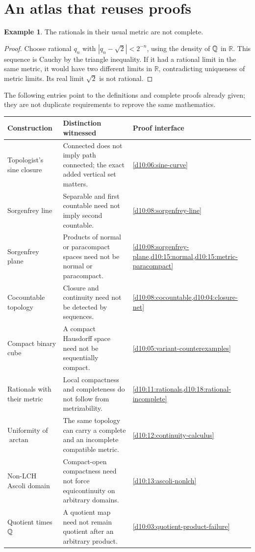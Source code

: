 \documentclass[11pt,oneside,openany]{book}
\theoremstyle{definition}
\newtheorem{example}[theorem]{Example}
\theoremstyle{remark}
\newcommand{\R}{\mathbb R}\newcommand{\C}{\mathbb C}
\begin{document}
\section{An atlas that reuses proofs}
\begin{example}\label{d10:18:rational-incomplete}
The rationals in their usual metric are not complete.
\end{example}
\begin{proof}
Choose rational $q_n$ with $|q_n-\sqrt2|<2^{-n}$, using the density
of $\mathbb Q$ in $\R$. This sequence is Cauchy by the triangle inequality.
If it had a rational limit in the same metric, it would have two
different limits in $\R$, contradicting uniqueness of metric limits.
Its real limit $\sqrt2$ is not rational.
\end{proof}

The following entries point to the definitions and complete proofs already
given; they are not duplicate requirements to reprove the same mathematics.
\begin{longtable}{p{}p{}p{}}
\toprule
Construction & Distinction witnessed & Proof interface\\
\midrule
\endhead
Topologist's sine closure &
Connected does not imply path connected; the exact added vertical set matters. &
\cref{d10:06:sine-curve}\\
Sorgenfrey line &
Separable and first countable need not imply second countable. &
\cref{d10:08:sorgenfrey-line}\\
Sorgenfrey plane &
Products of normal or paracompact spaces need not be normal or paracompact. &
\cref{d10:08:sorgenfrey-plane,d10:15:normal,d10:15:metric-paracompact}\\
Cocountable topology &
Closure and continuity need not be detected by sequences. &
\cref{d10:08:cocountable,d10:04:closure-net}\\
Compact binary cube &
A compact Hausdorff space need not be sequentially compact. &
\cref{d10:05:variant-counterexamples}\\
Rationals with their metric &
Local compactness and completeness do not follow from metrizability. &
\cref{d10:11:rationals,d10:18:rational-incomplete}\\
Uniformity of $\arctan$ &
The same topology can carry a complete and an incomplete compatible metric. &
\cref{d10:12:continuity-calculus}\\
Non-LCH Ascoli domain &
Compact-open compactness need not force equicontinuity on arbitrary domains. &
\cref{d10:13:ascoli-nonlch}\\
Quotient times $\mathbb Q$ &
A quotient map need not remain quotient after an arbitrary product. &
\cref{d10:03:quotient-product-failure}\\
\bottomrule
\end{longtable}
\end{document}
